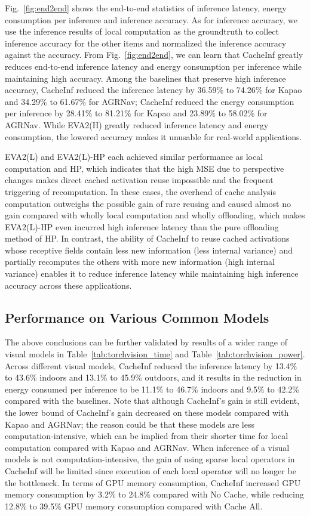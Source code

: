 Fig.~\ref{fig:end2end} shows the end-to-end statistics of inference latency, energy consumption per inference and inference accuracy.
As for inference accuracy, we use the inference results of local computation as the groundtruth to collect inference accuracy for the other items and normalized the inference accuracy against the accuracy.
From Fig.~\ref{fig:end2end}, we can learn that CacheInf greatly reduces end-to-end inference latency and energy consumption per inference while maintaining high accuracy.
Among the baselines that preserve high inference accuracy, CacheInf reduced the inference latency by 36.59\% to 74.26\% for Kapao and 34.29\% to 61.67\% for AGRNav;
CacheInf reduced the energy consumption per inference by 28.41\% to 81.21\% for Kapao and 23.89\% to 58.02\% for AGRNav.
While EVA2(H) greatly reduced inference latency and energy consumption, the lowered accuracy makes it unusable for real-world applications.

EVA2(L) and EVA2(L)-HP each achieved similar performance as local computation and HP, which indicates that the high MSE due to perspective changes makes direct cached activation reuse impossible and the frequent triggering of recomputation.
In these cases, the overhead of cache analysis computation outweighs the possible gain of rare reusing and caused almost no gain compared with wholly local computation and wholly offloading, which makes EVA2(L)-HP even incurred high inference latency than the pure offloading method of HP.
In contrast, the ability of CacheInf to reuse cached activations whose receptive fields contain less new information (less internal variance) and partially recomputes the others with more new information (high internal variance) enables it to reduce inference latency while maintaining high inference accuracy across these applications.

\subsection{Performance on Various Common Models}
The above conclusions can be further validated by results of a wider range of visual models in Table~\ref{tab:torchvision_time} and Table~\ref{tab:torchvision_power}.
Across different visual models, CacheInf reduced the inference latency by 13.4\% to 43.6\% indoors and 13.1\% to 45.9\% outdoors, and it results in the reduction in energy consumed per inference to be 11.1\% to 46.7\% indoors and 9.5\% to 42.2\%
compared with the baselines.
Note that although CacheInf's gain is still evident, the lower bound of CacheInf's gain decreased on these models compared with Kapao and AGRNav; the reason could be that these models are less computation-intensive, which can be implied from their shorter time for local computation compared with Kapao and AGRNav.
When inference of a visual models is not computation-intensive, the gain of using sparse local operators in CacheInf will be limited since execution of each local operator will no longer be the bottleneck.
In terms of GPU memory consumption, CacheInf increased GPU memory consumption by 3.2\% to 24.8\% compared with No Cache, while reducing 12.8\% to 39.5\% GPU memory consumption compared with Cache All.

